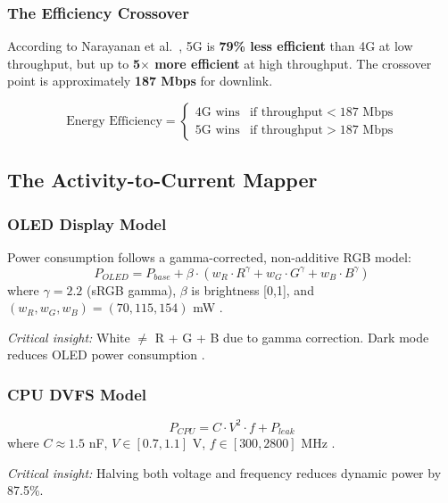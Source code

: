 \documentclass[12pt]{article}
\begin{document}
\subsubsection{The Efficiency Crossover}
According to Narayanan et al.\ \cite{narayanan_5g}, 5G is \textbf{79\% less efficient} than 4G at low throughput, but up to \textbf{5$\times$ more efficient} at high throughput. The crossover point is approximately \textbf{187 Mbps} for downlink.

\begin{equation}
    \text{Energy Efficiency} = \begin{cases}
        \text{4G wins} & \text{if throughput} < 187 \text{ Mbps} \\
        \text{5G wins} & \text{if throughput} > 187 \text{ Mbps}
    \end{cases}
\end{equation}

\subsection{The Activity-to-Current Mapper}

\subsubsection{OLED Display Model}
Power consumption follows a gamma-corrected, non-additive RGB model:
\begin{equation}
    P_{OLED} = P_{base} + \beta \cdot \left(w_R \cdot R^{\gamma} + w_G \cdot G^{\gamma} + w_B \cdot B^{\gamma}\right)
\end{equation}
where $\gamma = 2.2$ (sRGB gamma), $\beta$ is brightness [0,1], and $(w_R, w_G, w_B) = (70, 115, 154)$ mW \cite{ti_oled}.

\textit{Critical insight:} White $\neq$ R + G + B due to gamma correction. Dark mode reduces OLED power consumption \cite{ti_oled}.

\subsubsection{CPU DVFS Model}
\begin{equation}
    P_{CPU} = C \cdot V^2 \cdot f + P_{leak}
\end{equation}
where $C \approx 1.5$ nF, $V \in [0.7, 1.1]$ V, $f \in [300, 2800]$ MHz \cite{dvfs_survey}.

\textit{Critical insight:} Halving both voltage and frequency reduces dynamic power by 87.5\%.
\end{document}
